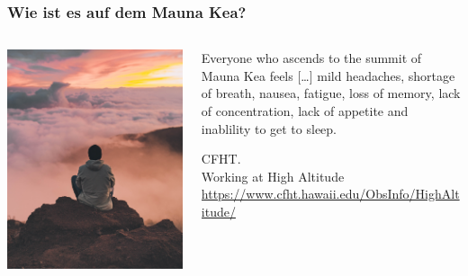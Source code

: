 \documentclass{beamer}
\begin{document}
\begin{frame}
\frametitle{Wie ist es auf dem Mauna Kea?}

\begin{columns}[c]

\begin{column}{5cm}

\begin{center}

\includegraphics[width=\textwidth]{maunakea.jpg}

\end{center}

\end{column}

\begin{column}{5cm}

  \epigraph{Everyone who ascends to the summit of Mauna Kea feels [\dots] mild headaches, shortage of breath, nausea, fatigue, loss of memory, lack of concentration, lack of appetite and inablility to get to sleep.}{CFHT.\\ Working at High Altitude \\ \url{https://www.cfht.hawaii.edu/ObsInfo/HighAltitude/}}

\end{column}

\end{columns}

\end{frame}
 
\end{document}
